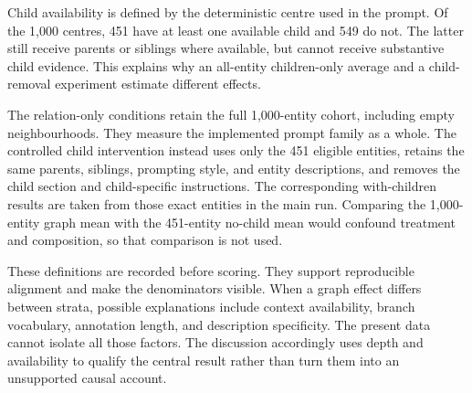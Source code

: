 Child availability is defined by the deterministic centre used in the prompt. Of the 1,000 centres, 451 have at least one available child and 549 do not. The latter still receive parents or siblings where available, but cannot receive substantive child evidence. This explains why an all-entity children-only average and a child-removal experiment estimate different effects.


The relation-only conditions retain the full 1,000-entity cohort, including empty neighbourhoods. They measure the implemented prompt family as a whole. The controlled child intervention instead uses only the 451 eligible entities, retains the same parents, siblings, prompting style, and entity descriptions, and removes the child section and child-specific instructions. The corresponding with-children results are taken from those exact entities in the main run. Comparing the 1,000-entity graph mean with the 451-entity no-child mean would confound treatment and composition, so that comparison is not used.


These definitions are recorded before scoring. They support reproducible alignment and make the denominators visible. When a graph effect differs between strata, possible explanations include context availability, branch vocabulary, annotation length, and description specificity. The present data cannot isolate all those factors. The discussion accordingly uses depth and availability to qualify the central result rather than turn them into an unsupported causal account.

